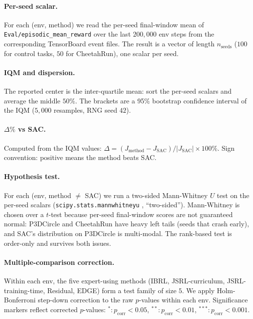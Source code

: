 \documentclass{article}
\begin{document}
\paragraph{Per-seed scalar.} For each (env, method) we read the per-seed
final-window mean of \texttt{Eval/episodic\_mean\_reward} over the last
$200{,}000$ env steps from the corresponding TensorBoard event files.
The result is a vector of length $n_{\mathrm{seeds}}$ ($100$ for control
tasks, $50$ for CheetahRun), one scalar per seed.

\paragraph{IQM and dispersion.} The reported center is the
inter-quartile mean: sort the per-seed scalars and average the middle
$50\%$. The brackets are a 95\% bootstrap confidence interval of the
IQM ($5{,}000$ resamples, RNG seed $42$).

\paragraph{$\Delta\%$ vs SAC.} Computed from the IQM values:
$\Delta = (J_{\mathrm{method}} - J_{\mathrm{SAC}})/|J_{\mathrm{SAC}}|
\times 100\%$. Sign convention: positive means the method beats SAC.

\paragraph{Hypothesis test.} For each (env, method $\neq$ SAC) we run a
two-sided Mann-Whitney $U$ test on the per-seed scalars
(\texttt{scipy.stats.mannwhitneyu} \citep{virtanen2020scipy},
``two-sided''). Mann-Whitney is
chosen over a $t$-test because per-seed final-window scores are not
guaranteed normal: P3DCircle and CheetahRun have heavy left tails
(seeds that crash early), and SAC's distribution on P3DCircle is
multi-modal. The rank-based test is order-only and survives both
issues.

\paragraph{Multiple-comparison correction.} Within each env, the five
expert-using methods (IBRL, JSRL-curriculum, JSRL-training-time, Residual, EDGE) form a
test family of size $5$. We apply Holm-Bonferroni step-down correction
to the raw $p$-values within each env. Significance markers reflect
corrected $p$-values: $^{*}{:}p_{\mathrm{corr}}{<}0.05$,
$^{**}{:}p_{\mathrm{corr}}{<}0.01$,
$^{***}{:}p_{\mathrm{corr}}{<}0.001$.
\end{document}
